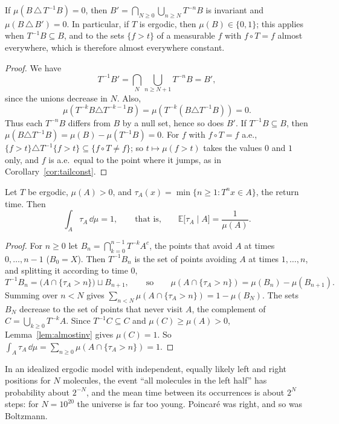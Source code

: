 \begin{lemma}\label{lem:almostinv}
If $\mu(B\,\triangle\,T^{-1}B)=0$, then $B'=\bigcap_{N\ge0}\bigcup_{n\ge N}T^{-n}B$ is invariant and $\mu(B\,\triangle\,B')=0$. In particular, if $T$ is ergodic, then $\mu(B)\in\{0,1\}$; this applies when
$T^{-1}B\subseteq B$, and to the sets $\{f>t\}$ of a measurable $f$ with $f\circ T=f$ almost everywhere, which is therefore almost everywhere constant.
\end{lemma}
\begin{proof}
We have
\[
T^{-1}B'=\bigcap_N\bigcup_{n\ge N+1}T^{-n}B=B',
\]
since the unions decrease in $N$. Also,
\[
\mu(T^{-k}B\triangle T^{-k-1}B)=\mu(T^{-k}(B\triangle T^{-1}B))=0.
\]
Thus each $T^{-n}B$ differs from $B$ by a null set, hence so does $B'$.
If $T^{-1}B\subseteq B$, then $\mu(B\triangle T^{-1}B)=\mu(B)-\mu(T^{-1}B)=0$. For $f$ with $f\circ T=f$ a.e., $\{f>t\}\triangle T^{-1}\{f>t\}\subseteq\{f\circ T\neq f\}$; so $t\mapsto\mu(f>t)$ takes the values $0$ and $1$ only, and
$f$ is a.e.\ equal to the point where it jumps, as in Corollary~\ref{cor:tailconst}.
\end{proof}

\begin{theorem}\label{thm:kac}
Let $T$ be ergodic, $\mu(A)>0$, and $\tau_A(x)=\min\{n\ge1:T^nx\in A\}$, the return time. Then
\[
\int_A\tau_A\,\dd\mu=1,\qquad\text{that is,}\qquad\mathbb E\bigl[\tau_A\mid A\bigr]=\frac1{\mu(A)}.
\]
\end{theorem}
\begin{proof}
For $n\ge0$ let $B_n=\bigcap_{k=0}^{n-1}T^{-k}A^c$, the points that avoid $A$ at times $0,\dots,n-1$ ($B_0=X$). Then $T^{-1}B_n$ is the set of points avoiding $A$ at times $1,\dots,n$, and splitting it according
to time $0$,
\[
T^{-1}B_n=\bigl(A\cap\{\tau_A>n\}\bigr)\sqcup B_{n+1},\qquad\text{so}\qquad\mu(A\cap\{\tau_A>n\})=\mu(B_n)-\mu(B_{n+1}).
\]
Summing over $n<N$ gives $\sum_{n<N}\mu(A\cap\{\tau_A>n\})=1-\mu(B_N)$. The sets $B_N$ decrease to the set of points that never visit $A$, the complement of $C=\bigcup_{k\ge0}T^{-k}A$. Since
$T^{-1}C\subseteq C$ and $\mu(C)\ge\mu(A)>0$, Lemma~\ref{lem:almostinv} gives $\mu(C)=1$. So $\int_A\tau_A\,\dd\mu=\sum_{n\ge0}\mu(A\cap\{\tau_A>n\})=1$.
\end{proof}

In an idealized ergodic model with independent, equally likely left and right positions for $N$ molecules, the event ``all molecules in the left half'' has probability about $2^{-N}$, and the mean time between its occurrences is about $2^N$ steps: for $N=10^{20}$ the
universe is far too young. Poincar\'e was right, and so was Boltzmann.

